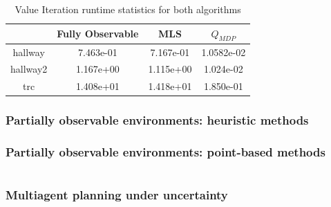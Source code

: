 \documentclass[10pt,a4paper]{article}
\begin{document}
\begin{table}
\centering
\begin{tabular}{ c || c | c | c }
\hfill & Fully Observable & MLS & $Q_{MDP}$\\
\hline
hallway & 7.463e-01 & 7.167e-01 & 1.0582e-02\\
hallway2 & 1.167e+00 & 1.115e+00 & 1.024e-02\\
trc & 1.408e+01 & 1.418e+01 & 1.850e-01\\
\end{tabular}
\caption{Value Iteration runtime statistics for both algorithms}
\label{table:rewards}
\end{table}
 

\section{Partially observable environments: heuristic methods}

\section{Partially observable environments: point-based methods}

\part{}
\section{Multiagent planning under uncertainty}
\end{document}
